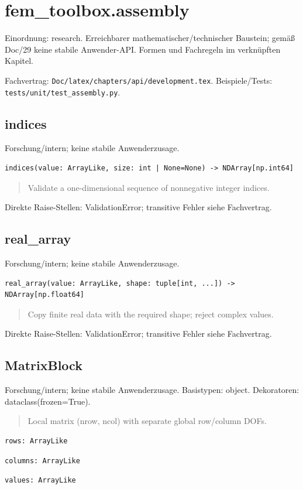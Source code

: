 \section{fem\_toolbox.assembly}
Einordnung: research. Erreichbarer mathematischer/technischer Baustein; gemäß Doc/29 keine stabile Anwender-API. Formen und Fachregeln im verknüpften Kapitel.
\par Fachvertrag: \nolinkurl{Doc/latex/chapters/api/development.tex}. Beispiele/Tests:
\nolinkurl{tests/unit/test_assembly.py}.
\subsection{indices}
Forschung/intern; keine stabile Anwenderzusage.
\begin{lstlisting}
indices(value: ArrayLike, size: int | None=None) -> NDArray[np.int64]
\end{lstlisting}
\begin{quote}
Validate a one-dimensional sequence of nonnegative integer indices.
\end{quote}
Direkte Raise-Stellen: ValidationError; transitive Fehler siehe Fachvertrag.
\subsection{real\_array}
Forschung/intern; keine stabile Anwenderzusage.
\begin{lstlisting}
real_array(value: ArrayLike, shape: tuple[int, ...]) -> NDArray[np.float64]
\end{lstlisting}
\begin{quote}
Copy finite real data with the required shape; reject complex values.
\end{quote}
Direkte Raise-Stellen: ValidationError; transitive Fehler siehe Fachvertrag.
\subsection{MatrixBlock}
Forschung/intern; keine stabile Anwenderzusage.
Basistypen: object. Dekoratoren: dataclass(frozen=True).
\begin{quote}
Local matrix (nrow, ncol) with separate global row/column DOFs.
\end{quote}
\begin{lstlisting}
rows: ArrayLike
\end{lstlisting}
\begin{lstlisting}
columns: ArrayLike
\end{lstlisting}
\begin{lstlisting}
values: ArrayLike
\end{lstlisting}
